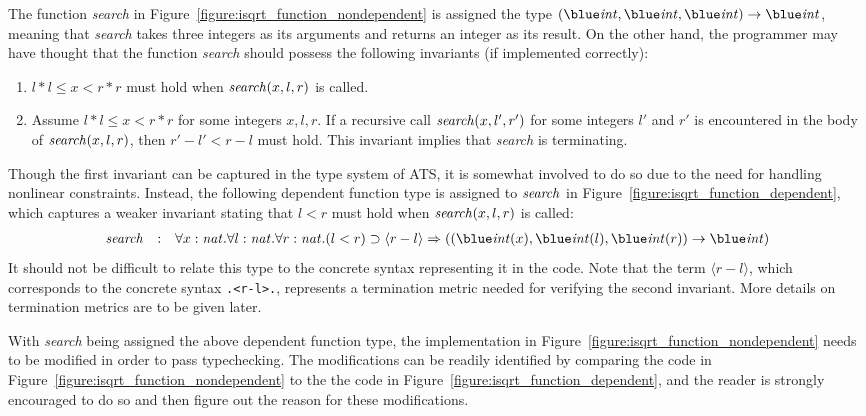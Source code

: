 The function {\it search} in Figure~\ref{figure:isqrt_function_nondependent}
is assigned the type $(\tint, \tint, \tint) \timp \tint$, meaning that {\it
search} takes three integers as its arguments and returns an integer as its
result.  On the other hand, the programmer may have thought that the
function {\it search} should possess the following invariants (if
implemented correctly):
\begin{enumerate}
\item
$l*l\leq x < r*r$ must hold when ${\it search}(x, l, r)$ is called.
\item
Assume $l*l\leq x < r*r$ for some integers $x, l, r$.  If a recursive call
${\it search}(x, l', r')$ for some integers $l'$ and $r'$ is encountered in
the body of ${\it search}(x, l, r)$, then $r'-l' < r - l$ must hold. This
invariant implies that {\it search} is terminating.
\end{enumerate}
Though the first invariant can be captured in the type system of ATS, it is
somewhat involved to do so due to the need for handling nonlinear
constraints. Instead, the following dependent function type is assigned to
${\it search}$ in Figure~\ref{figure:isqrt_function_dependent}, which
captures a weaker invariant stating that $l < r$ must hold when ${\it
search}(x, l, r)$ is called:
\[\begin{array}{lcr}
{\it search} & : & \forall x:\snat.\forall l:\snat.\forall r:\snat.
(l < r) \Bimp \langle r-l\rangle \metimp ((\tint(x), \tint(l), \tint(r))\timp\tint)
\end{array}\]
It should not be difficult to relate this type to the concrete syntax
representing it in the code. Note that the term $\langle r-l\rangle$, which
corresponds to the concrete syntax \verb`.<r-l>.`, represents a termination
metric needed for verifying the second invariant.  More details on
termination metrics are to be given later.

With {\it search} being assigned the above dependent function type, the
implementation in Figure~\ref{figure:isqrt_function_nondependent} needs to
be modified in order to pass typechecking. The modifications can be readily
identified by comparing the code in
Figure~\ref{figure:isqrt_function_nondependent} to the the code in
Figure~\ref{figure:isqrt_function_dependent}, and the reader is strongly
encouraged to do so and then figure out the reason for these
modifications.

